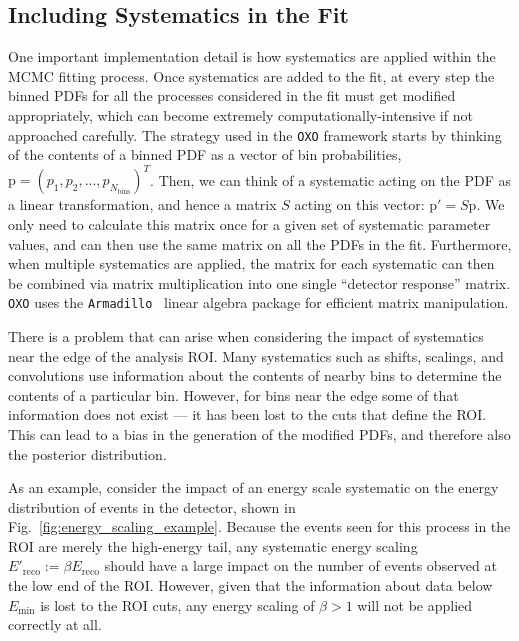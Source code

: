 \subsection{Including Systematics in the Fit}
One important implementation detail is how systematics are applied within the MCMC fitting process. Once systematics are added to the fit, at every step the binned PDFs for all the processes considered in the fit must get modified appropriately, which can become extremely computationally-intensive if not approached carefully. The strategy used in the \texttt{OXO} framework starts by thinking of the contents of a binned PDF as a vector of bin probabilities, $\bm{\mathrm{p}} = \left(p_{1}, p_{2}, ..., p_{N_{\textrm{bins}}}\right)^{T}$. Then, we can think of a systematic acting on the PDF as a linear transformation, and hence a matrix $S$ acting on this vector: $\bm{\mathrm{p}'} = S\bm{\mathrm{p}}$. We only need to calculate this matrix once for a given set of systematic parameter values, and can then use the same matrix on all the PDFs in the fit. Furthermore, when multiple systematics are applied, the matrix for each systematic can then be combined via matrix multiplication into one single ``detector response'' matrix. \texttt{OXO} uses the \texttt{Armadillo}~\cite{} %
linear algebra package for efficient matrix manipulation.

There is a problem that can arise when considering the impact of systematics near the edge of the analysis ROI. Many systematics such as shifts, scalings, and convolutions use information about the contents of nearby bins to determine the contents of a particular bin. However, for bins near the edge some of that information does not exist --- it has been lost to the cuts that define the ROI. This can lead to a bias in the generation of the modified PDFs, and therefore also the posterior distribution.

As an example, consider the impact of an energy scale systematic on the energy distribution of  events in the detector, shown in Fig.~\ref{fig:energy_scaling_example}. Because the events seen for this process in the ROI are merely the high-energy tail, any systematic energy scaling $E'_{\textrm{reco}} := \beta E_{\textrm{reco}}$ should have a large impact on the number of events observed at the low end of the ROI. However, given that the information about data below $E_{\textrm{min}}$ is lost to the ROI cuts, any energy scaling of $\beta>1$ will not be applied correctly at all.

